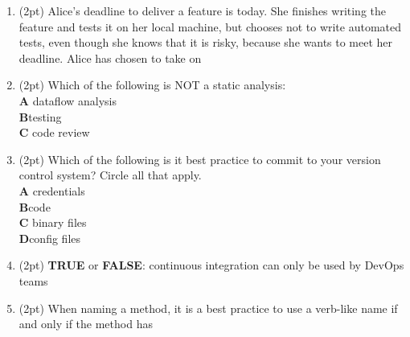 \documentclass{article}
\newif\ifkey
\newcommand{\correct}[1]{\ifkey\color{red}\textbf{#1}\color{black}\else\textbf{#1}\fi\xspace}
\newcommand{\answershort}[1]{\ifkey\color{red}\underline{\textbf{#1}}\color{black}\else\underline{\hspace{3in}}\fi\xspace}
\newcommand*{\pts}[1]{\addtocounter{points}{#1}(#1pt)}
\begin{document}
\begin{spacing}{1.4}
\begin{enumerate}[leftmargin=*]
\item \pts{2} Alice's deadline to deliver a feature is today. She finishes writing the feature and tests it on her local machine, but chooses not to write automated tests,
  even though she knows that it is risky, because
  she wants to meet her deadline. Alice has chosen to take on \answershort{technical debt}

\item \pts{2}
  Which of the following is NOT a static analysis:
  \\ \textbf{A}\hspace{0.2in} dataflow analysis
  \\ \correct{B}\hspace{0.2in}testing
  \\ \textbf{C}\hspace{0.2in} code review

\item \pts{2}
  Which of the following is it best practice to commit to your version control system? Circle all that apply.
  \\ \textbf{A}\hspace{0.2in} credentials
  \\ \correct{B}\hspace{0.2in}code
  \\ \textbf{C}\hspace{0.2in} binary files
  \\ \correct{D}\hspace{0.2in}config files

\item \pts{2}
  \textbf{TRUE} or \correct{FALSE}: continuous integration can only be used by DevOps teams

\item \pts{2}
  When naming a method, it is a best practice to use a verb-like name if and only if the method has \answershort{side-effects}
  





\end{enumerate}
\end{spacing}
\end{document}
